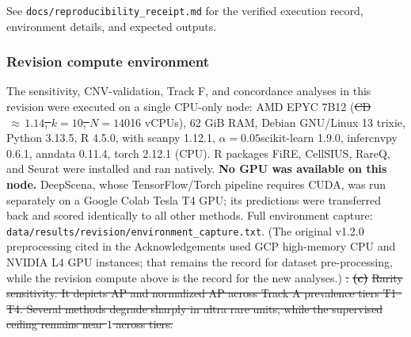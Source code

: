 \documentclass[10pt]{article}
\providecommand{\DIFaddtex}[1]{{\protect\color{trackgreen}#1}} %
\providecommand{\DIFdeltex}[1]{{\protect\color{red}\sout{#1}}}                      %
\providecommand{\DIFaddbegin}{} %
\providecommand{\DIFaddend}{} %
\providecommand{\DIFdelend}{} %
\providecommand{\DIFaddFL}[1]{\DIFadd{#1}} %
\providecommand{\DIFdelFL}[1]{\DIFdel{#1}} %
\providecommand{\DIFaddbeginFL}{} %
\providecommand{\DIFaddendFL}{} %
\providecommand{\DIFdelbeginFL}{} %
\providecommand{\DIFdelendFL}{} %
\providecommand{\DIFadd}[1]{\texorpdfstring{\DIFaddtex{#1}}{#1}} %
\providecommand{\DIFdel}[1]{\texorpdfstring{\DIFdeltex{#1}}{}} %
\newcommand{\DIFscaledelfig}{0.5}
\newlength{\DIFdelgraphicswidth} %
\newlength{\DIFdelgraphicsheight} %
\newcommand{\DIFaddincludegraphics}[2][]{{\color{trackgreen}\fbox{\DIFOincludegraphics[#1]{#2}}}} %
\newcommand{\DIFdelincludegraphics}[2][]{%
\sbox{\DIFdelgraphicsbox}{\DIFOincludegraphics[#1]{#2}}%
\settoboxwidth{\DIFdelgraphicswidth}{\DIFdelgraphicsbox} %
\settoboxtotalheight{\DIFdelgraphicsheight}{\DIFdelgraphicsbox} %
\scalebox{\DIFscaledelfig}{%
\parbox[b]{\DIFdelgraphicswidth}{\usebox{\DIFdelgraphicsbox}\\[-\baselineskip] \rule{\DIFdelgraphicswidth}{0em}}\llap{\resizebox{\DIFdelgraphicswidth}{\DIFdelgraphicsheight}{%
\setlength{\unitlength}{\DIFdelgraphicswidth}%
\begin{picture}(1,1)%
\thicklines\linethickness{2pt} %
{\color[rgb]{1,0,0}\put(0,0){\framebox(1,1){}}}%
{\color[rgb]{1,0,0}\put(0,0){\line( 1,1){1}}}%
{\color[rgb]{1,0,0}\put(0,1){\line(1,-1){1}}}%
\end{picture}%
}\hspace*{3pt}}} %
} %
\DeclareRobustCommand{\DIFaddbegin}{\DIFOaddbegin \let\includegraphics\DIFaddincludegraphics} %
\DeclareRobustCommand{\DIFaddend}{\DIFOaddend \let\includegraphics\DIFOincludegraphics} %
\DeclareRobustCommand{\DIFdelend}{\DIFOaddend \let\includegraphics\DIFOincludegraphics} %
\DeclareRobustCommand{\DIFaddbeginFL}{\DIFOaddbeginFL \let\includegraphics\DIFaddincludegraphics} %
\DeclareRobustCommand{\DIFaddendFL}{\DIFOaddendFL \let\includegraphics\DIFOincludegraphics} %
\DeclareRobustCommand{\DIFdelbeginFL}{\DIFOdelbeginFL \let\includegraphics\DIFdelincludegraphics} %
\DeclareRobustCommand{\DIFdelendFL}{\DIFOaddendFL \let\includegraphics\DIFOincludegraphics} %
\begin{document}
\DIFaddFL{See }\texttt{\DIFaddFL{docs/reproducibility\_receipt.md}} \DIFaddFL{for the verified execution
record, environment details, and expected outputs.
}

\subsubsection{\DIFaddFL{Revision compute
environment}}\label{revision-compute-environment}

\DIFaddFL{The sensitivity, CNV-validation, Track F, and concordance analyses in
this revision were executed on a single CPU-only node: AMD EPYC 7B12 }\DIFaddendFL (\DIFdelbeginFL \DIFdelFL{CD$\,\approx\,1.14$, $k=10$, $N=140$}\DIFdelendFL \DIFaddbeginFL \DIFaddFL{16
vCPUs), 62 GiB RAM, Debian GNU/Linux 13 trixie, Python 3.13.5, R 4.5.0,
with scanpy 1.12.1}\DIFaddendFL , \DIFdelbeginFL \DIFdelFL{$\alpha=0.05$}\DIFdelendFL \DIFaddbeginFL \DIFaddFL{scikit-learn 1.9.0, infercnvpy 0.6.1, anndata
0.11.4, torch 2.12.1 (CPU). R packages FiRE, CellSIUS, RareQ, and Seurat
were installed and ran natively. }\textbf{\DIFaddFL{No GPU was available on this
node.}} \DIFaddFL{DeepScena, whose TensorFlow/Torch pipeline requires CUDA, was run
separately on a Google Colab Tesla T4 GPU; its predictions were
transferred back and scored identically to all other methods. Full
environment capture:
}\texttt{\DIFaddFL{data/results/revision/environment\_capture.txt}}\DIFaddFL{. (The original
v1.2.0 preprocessing cited in the Acknowledgements used GCP high-memory
CPU and NVIDIA L4 GPU instances; that remains the record for dataset
pre-processing, while the revision compute above is the record for the
new analyses.}\DIFaddendFL )
\DIFdelbeginFL \DIFdelFL{. }\textbf{\DIFdelFL{(c)}} %
\DIFdelFL{Rarity sensitivity. It depicts AP and normalized AP across Track A prevalence tiers T1--T4. Several methods degrade sharply in ultra rare units, while the supervised ceiling remains near $1$ across tiers.}%
\DIFdelendFL 

\DIFdelbeginFL %
\DIFdelend \DIFaddbegin \begin{center}\DIFadd{\rule{0.5\linewidth}{0.5pt}}\end{center}
\DIFaddend 
\end{document}
